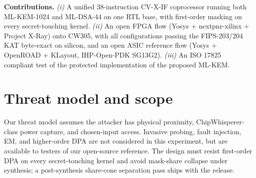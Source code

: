 \documentclass[10pt,conference]{IEEEtran}
\newcommand{\mlkem}{ML-KEM-1024\xspace}
\newcommand{\mldsa}{ML-DSA-44\xspace}
\begin{document}

\noindent\textbf{Contributions.}
\emph{(i)} A unified 38-instruction CV-X-IF coprocessor running both \mlkem and \mldsa on one RTL base, with first-order masking on every secret-touching kernel.
\emph{(ii)} An open FPGA flow (Yosys + nextpnr-xilinx + Project X-Ray) onto CW305, with all configurations passing the FIPS-203/204 KAT byte-exact on silicon, and an open ASIC reference flow (Yosys + OpenROAD + KLayout, IHP-Open-PDK SG13G2).
\emph{(iii)} An ISO 17825 compliant test of the protected implementation of the proposed ML-KEM.

\section{Threat model and scope}
\label{sec:threat}
Our threat model assumes the attacker has physical proximity, ChipWhisperer-class power capture, and chosen-input access. Invasive probing, fault injection, EM, and higher-order DPA are not considered in this experiment, but are available to testers of our open-source reference. The design must resist first-order DPA on every secret-touching kernel and avoid mask-share collapse under synthesis; a post-synthesis share-cone separation pass ships with the release.
\end{document}
